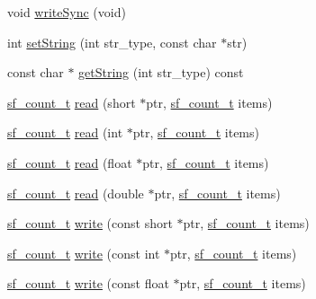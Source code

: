 \begin{DoxyCompactItemize}
\item 
void \mbox{\hyperlink{class_sndfile_handle_a7d7e6ec33d07dfae354c2909fafcdbb2}{write\+Sync}} (void)
\item 
int \mbox{\hyperlink{class_sndfile_handle_a6fa21cda95c6016c9f2f133d2e94da8b}{set\+String}} (int str\+\_\+type, const char $\ast$str)
\item 
const char $\ast$ \mbox{\hyperlink{class_sndfile_handle_a22653a8f3f77584ae027179371d6bd9b}{get\+String}} (int str\+\_\+type) const
\item 
\mbox{\hyperlink{sndfile_8h_af2b12fded74bc949f1f1f392a2af4892}{sf\+\_\+count\+\_\+t}} \mbox{\hyperlink{class_sndfile_handle_ae3125a94ea83be0193dead02b151d008}{read}} (short $\ast$ptr, \mbox{\hyperlink{sndfile_8h_af2b12fded74bc949f1f1f392a2af4892}{sf\+\_\+count\+\_\+t}} items)
\item 
\mbox{\hyperlink{sndfile_8h_af2b12fded74bc949f1f1f392a2af4892}{sf\+\_\+count\+\_\+t}} \mbox{\hyperlink{class_sndfile_handle_af6d8fa499d36a9bd68301023800ac8b9}{read}} (int $\ast$ptr, \mbox{\hyperlink{sndfile_8h_af2b12fded74bc949f1f1f392a2af4892}{sf\+\_\+count\+\_\+t}} items)
\item 
\mbox{\hyperlink{sndfile_8h_af2b12fded74bc949f1f1f392a2af4892}{sf\+\_\+count\+\_\+t}} \mbox{\hyperlink{class_sndfile_handle_aa2ee9aaafe7baa6b7e5d26e9dd2a0321}{read}} (float $\ast$ptr, \mbox{\hyperlink{sndfile_8h_af2b12fded74bc949f1f1f392a2af4892}{sf\+\_\+count\+\_\+t}} items)
\item 
\mbox{\hyperlink{sndfile_8h_af2b12fded74bc949f1f1f392a2af4892}{sf\+\_\+count\+\_\+t}} \mbox{\hyperlink{class_sndfile_handle_a44892d06c66e34bfc5f1948ee58b43ac}{read}} (double $\ast$ptr, \mbox{\hyperlink{sndfile_8h_af2b12fded74bc949f1f1f392a2af4892}{sf\+\_\+count\+\_\+t}} items)
\item 
\mbox{\hyperlink{sndfile_8h_af2b12fded74bc949f1f1f392a2af4892}{sf\+\_\+count\+\_\+t}} \mbox{\hyperlink{class_sndfile_handle_ae7aac54beecd7eb08d080f4e6cd171f4}{write}} (const short $\ast$ptr, \mbox{\hyperlink{sndfile_8h_af2b12fded74bc949f1f1f392a2af4892}{sf\+\_\+count\+\_\+t}} items)
\item 
\mbox{\hyperlink{sndfile_8h_af2b12fded74bc949f1f1f392a2af4892}{sf\+\_\+count\+\_\+t}} \mbox{\hyperlink{class_sndfile_handle_a6c787b63a36e8c432c38aad125444239}{write}} (const int $\ast$ptr, \mbox{\hyperlink{sndfile_8h_af2b12fded74bc949f1f1f392a2af4892}{sf\+\_\+count\+\_\+t}} items)
\item 
\mbox{\hyperlink{sndfile_8h_af2b12fded74bc949f1f1f392a2af4892}{sf\+\_\+count\+\_\+t}} \mbox{\hyperlink{class_sndfile_handle_a25f654f209d8ef92c988be402384dbff}{write}} (const float $\ast$ptr, \mbox{\hyperlink{sndfile_8h_af2b12fded74bc949f1f1f392a2af4892}{sf\+\_\+count\+\_\+t}} items)

\end{DoxyCompactItemize}
